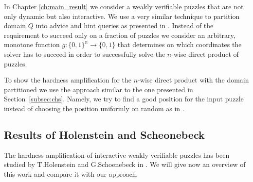 In Chapter \ref{ch:main_result} we consider a weakly verifiable puzzles that are not only dynamic but also interactive.
We use a very similar technique to partition domain $Q$ into advice and hint queries as presented in \cite{Dodis:2009:SAI:1530441.1530450}.
Instead of the requirement to succeed only on a fraction of puzzles we consider an arbitrary, monotone function $g : \{0,1\}^{n} \rightarrow \{0,1\}$
that determines on which coordinates the solver has to succeed in order to successfully solve the $n$-wise direct product of puzzles.

To show the hardness amplification for the $n$-wise direct product with the domain partitioned we use
the approach similar to the one presented in Section~\ref{subsec:chs}. Namely, we try to find a good position for the input puzzle instead of
choosing the position uniformly on random as in \cite{Dodis:2009:SAI:1530441.1530450}.

\subsection{Results of Holenstein and Scheonebeck}
%
The hardness amplification of interactive weakly verifiable puzzles has been studied by T.Holenstein and G.Schoenebeck in \cite{DBLP:journals/corr/abs-1002-3534}.
We will give now an overview of this work and compare it with our approach.

